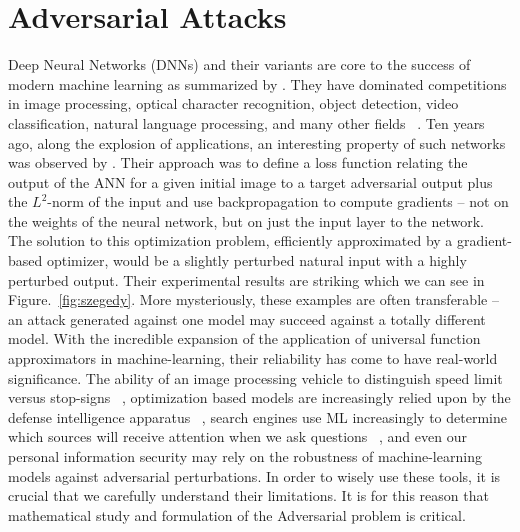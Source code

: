 \chapter{Adversarial Attacks}

\label{Chapter2} %

Deep Neural Networks (DNNs) and their variants are core to the success
of modern machine learning as summarized by \cite{prakash2018}. They
have dominated competitions in image processing, optical character
recognition, object detection, video classification, natural language
processing, and many other fields ~\cite{SCHMIDHUBER201585}. Ten years
ago, along the explosion of applications, an interesting property of
such networks was observed by \cite{Szegedy2013}. Their approach was to define a loss function
relating the output of the ANN for a given initial image to a target adversarial 
output plus the $L^2$-norm of the input and use backpropagation to
compute gradients -- not on the weights of the neural network, but on
just the input layer to the network. The solution to this optimization
problem, efficiently approximated by a gradient-based optimizer, would
be a slightly perturbed natural input with a highly perturbed
output. Their experimental results are striking which we can see in
Figure.~\ref{fig:szegedy}.  More mysteriously, these examples
are often transferable -- an attack generated against one
model may succeed against a totally different model. With the
incredible expansion of the application of universal function
approximators in machine-learning, their reliability has come to have
real-world significance. The ability of an image processing vehicle to
distinguish speed limit versus stop-signs ~\cite{stop-sign-paper},
optimization based models are increasingly relied upon by the defense
intelligence apparatus ~\cite{intelligence-applications}, search
engines use ML increasingly to
determine which sources will receive attention when we ask questions
~\cite{search-engines},
and even our personal information security may rely on the robustness
of machine-learning models against adversarial perturbations. In order
to wisely use these tools, it is crucial that we carefully understand
their limitations. It is for this reason that mathematical study and
formulation of the Adversarial problem is critical. 


